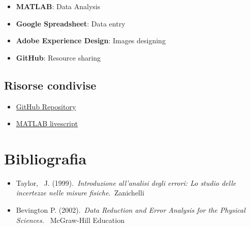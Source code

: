 \documentclass[10pt,a4paper]{article}
\providecommand{\tightlist}{\setlength{\itemsep}{0pt}\setlength{\parskip}{0pt}}%
\begin{document}
{\label{321913}}

\begin{itemize}
\tightlist
\item
  \textbf{MATLAB}: Data Analysis
\item
  \textbf{Google Spreadsheet}: Data entry
\item
  \textbf{Adobe Experience Design}: Images designing
\item
  \textbf{GitHub}: Resource sharing
\end{itemize}

\subsection*{Risorse condivise}

{\label{314313}}

\begin{itemize}
\tightlist
\item
  \href{https://github.com/dennisangemi/lab1-dfa/tree/main/exp-1}{GitHub
  Repository}
\item
  \href{https://drive.matlab.com/sharing/2e64529c-09bc-4c03-8059-75fa50e48ce6/exp_01.mlx}{MATLAB
  livescript}
\end{itemize}

\section*{Bibliografia}

{\label{333834}}

\begin{itemize}
\tightlist
\item
  Taylor,~ J. (1999).~\emph{Introduzione all'analisi degli errori: Lo
  studio delle incertezze nelle misure fisiche.~}Zanichelli
\item
  Bevington P. (2002).~\emph{Data Reduction and Error Analysis for the
  Physical Sciences.~} McGraw-Hill Education ~
\end{itemize}

\par\null

\FloatBarrier
\end{document}
